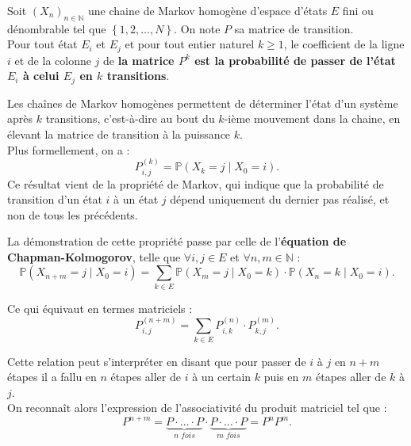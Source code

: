 \documentclass{article}
\begin{document}
\begin{tcolorbox}[colback=white,colframe=red!80!black,title=Matrice de transition pour $k$-transitions]
Soit $(X_n)_{n \in \mathbb{N}}$ une chaine de Markov homogène d'espace d'états $E$ fini ou dénombrable tel que $\left\{1,2,\ldots,N\right\}$. On note $P$ sa matrice de transition. \\

Pour tout état $E_i$ et $E_j$ et pour tout entier naturel $k \geq 1$, le coefficient de la ligne $i$ et de la colonne $j$ de \textbf{la matrice $P^k$ est la probabilité de passer de l'état $E_i$ à celui $E_j$ en $k$ transitions}.
\end{tcolorbox}

Les chaînes de Markov homogènes permettent de déterminer l'état d'un système après $k$ transitions, c'est-à-dire au bout du $k$-ième mouvement dans la chaine, en élevant la matrice de transition à la puissance $k$. \\
Plus formellement, on a :
\[
P_{i,j}^{(k)} = \mathbb{P}(X_k = j \mid X_0 = i).
\]
Ce résultat vient de la propriété de Markov, qui indique que la probabilité de transition d'un état $i$ à un état $j$ dépend uniquement du dernier pas réalisé, et non de tous les précédents.

\begin{tcolorbox}[colback=white,colframe=green!80!black,title=Démonstration]
La démonstration de cette propriété passe par celle de l'\textbf{équation de Chapman-Kolmogorov}, telle que $\forall i,j \in E$ et $\forall n,m \in \mathbb{N}$ :
\[
\mathbb{P}(X_{n+m} = j \mid X_0 = i) = \sum_{k \in E} \mathbb{P}(X_{m} = j \mid X_0 = k) \cdot \mathbb{P}(X_n = k \mid X_0 = i).
\]

Ce qui équivaut en termes matriciels :
\[
P_{i,j}^{(n+m)} = \sum_{k \in E} P_{i,k}^{(n)} \cdot P_{k,j}^{(m)}.
\]

Cette relation peut s'interpréter en disant que pour passer de $i$ à $j$ en $n+m$ étapes il a fallu en $n$ étapes aller de $i$ à un certain $k$ puis en $m$ étapes aller de $k$ à $j$. \\

On reconnaît alors l'expression de l'associativité du produit matriciel tel que :
\[
P^{n+m} = \underbrace{P \cdot \ldots \cdot P}_\textit{n fois} \cdot \underbrace{P \cdot \ldots \cdot P}_\textit{m fois} = P^{n}P^{m}.
\]
\end{tcolorbox}
\end{document}
